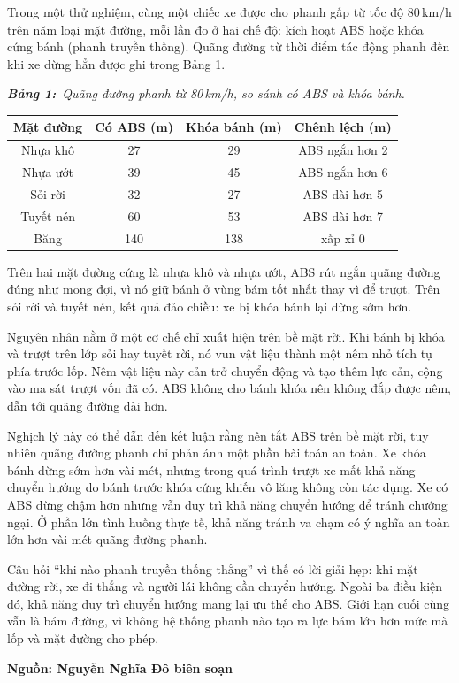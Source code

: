 \documentclass[12pt,a4paper,twoside]{article}
\newcommand{\tablecaption}[2]{%
    \par\vspace{2pt}%
    {\centering\textbf{\textit{Bảng #1:}}~\textit{#2}\par}%
    \vspace{0pt}%
}
\newenvironment{readingpassage}[1][]{%
    \begin{tcolorbox}[enhanced, colback=grayLight, colframe=secondaryBlue,
        coltitle=textDark, fonttitle=\bfseries, title={#1},
        rounded corners, arc=3mm, boxrule=1pt,
        left=15pt, right=15pt, top=10pt, bottom=10pt,
        breakable, before skip=10pt, after skip=10pt, drop fuzzy shadow]
    \setstretch{1.3}
}{\end{tcolorbox}}
\begin{document}
\begin{readingpassage}[]

Trong một thử nghiệm, cùng một chiếc xe được cho phanh gấp từ tốc độ 80\,km/h trên năm loại mặt đường, mỗi lần đo ở hai chế độ: kích hoạt ABS hoặc khóa cứng bánh (phanh truyền thống). Quãng đường từ thời điểm tác động phanh đến khi xe dừng hẳn được ghi trong Bảng 1.

\tablecaption{1}{Quãng đường phanh từ 80\,km/h, so sánh có ABS và khóa bánh.}
%
\begin{center}
\begin{tabular}{|c|c|c|c|}
\hline
\rowcolor{primaryBlue!12}
\textbf{Mặt đường} & \textbf{Có ABS (m)} & \textbf{Khóa bánh (m)} & \textbf{Chênh lệch (m)} \\
\hline
Nhựa khô & 27 & 29 & ABS ngắn hơn 2 \\
\hline
Nhựa ướt & 39 & 45 & ABS ngắn hơn 6 \\
\hline
Sỏi rời & 32 & 27 & ABS dài hơn 5 \\
\hline
Tuyết nén & 60 & 53 & ABS dài hơn 7 \\
\hline
Băng & 140 & 138 & xấp xỉ 0 \\
\hline
\end{tabular}
\end{center}

Trên hai mặt đường cứng là nhựa khô và nhựa ướt, ABS rút ngắn quãng đường đúng như mong đợi, vì nó giữ bánh ở vùng bám tốt nhất thay vì để trượt. Trên sỏi rời và tuyết nén, kết quả đảo chiều: xe bị khóa bánh lại dừng sớm hơn.

Nguyên nhân nằm ở một cơ chế chỉ xuất hiện trên bề mặt rời. Khi bánh bị khóa và trượt trên lớp sỏi hay tuyết rời, nó vun vật liệu thành một nêm nhỏ tích tụ phía trước lốp. Nêm vật liệu này cản trở chuyển động và tạo thêm lực cản, cộng vào ma sát trượt vốn đã có. ABS không cho bánh khóa nên không đắp được nêm, dẫn tới quãng đường dài hơn.

Nghịch lý này có thể dẫn đến kết luận rằng nên tắt ABS trên bề mặt rời, tuy nhiên quãng đường phanh chỉ phản ánh một phần bài toán an toàn. Xe khóa bánh dừng sớm hơn vài mét, nhưng trong quá trình trượt xe mất khả năng chuyển hướng do bánh trước khóa cứng khiến vô lăng không còn tác dụng. Xe có ABS dừng chậm hơn nhưng vẫn duy trì khả năng chuyển hướng để tránh chướng ngại. Ở phần lớn tình huống thực tế, khả năng tránh va chạm có ý nghĩa an toàn lớn hơn vài mét quãng đường phanh.

Câu hỏi ``khi nào phanh truyền thống thắng'' vì thế có lời giải hẹp: khi mặt đường rời, xe đi thẳng và người lái không cần chuyển hướng. Ngoài ba điều kiện đó, khả năng duy trì chuyển hướng mang lại ưu thế cho ABS. Giới hạn cuối cùng vẫn là bám đường, vì không hệ thống phanh nào tạo ra lực bám lớn hơn mức mà lốp và mặt đường cho phép.

\hfill\textbf{Nguồn: Nguyễn Nghĩa Đô biên soạn}
\end{readingpassage}
\end{document}
